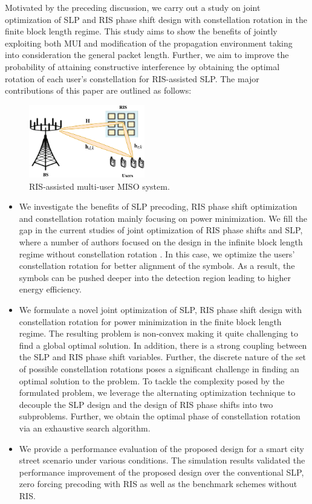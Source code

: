 \documentclass[10pt,conference]{IEEEtran}
\begin{document}
Motivated by the preceding discussion, we carry out a study on joint optimization of SLP and RIS phase shift design with constellation rotation in the finite block length regime. This study aims to show the benefits of jointly exploiting both MUI and modification of the propagation environment taking into consideration the general packet length. Further, we aim to improve the probability of attaining constructive interference by obtaining the optimal rotation of each user's constellation for RIS-assisted SLP.
The major contributions of this paper are outlined as follows:
\begin{figure}[t]
	\centering	\includegraphics[width=0.45\textwidth]{Images/symb33.eps} 
	\caption{RIS-assisted multi-user MISO system.}
	\label{fig:System}
\end{figure}
\begin{itemize}
    \item We investigate the benefits of SLP precoding, RIS phase shift optimization and constellation rotation mainly focusing on power minimization. We fill the gap in the current studies of joint optimization of RIS phase shifts and SLP, where a number of authors focused on the design in the infinite block length regime without constellation rotation \cite{shao2020minimum,liu2021intelligent,cheng2021degree}. In this case, we optimize the users' constellation rotation for better alignment of the symbols. As a result, the symbols can be pushed deeper into the detection region leading to higher energy efficiency. 
    \item We formulate a novel joint optimization of SLP, RIS phase shift design with constellation rotation for power minimization in the finite block length regime. The resulting problem is non-convex making it quite challenging to find a global optimal solution. In addition, there is a strong coupling between the SLP and RIS phase shift variables. Further, the discrete nature of the set of possible constellation rotations poses a significant challenge in finding an optimal solution to the problem. To tackle the complexity posed by the formulated problem, we leverage the alternating optimization technique to decouple the SLP design and the design of RIS phase shifts into two subproblems. Further, we obtain the optimal phase of constellation rotation via an exhaustive search algorithm.
    \item We provide a performance evaluation of the proposed design for a smart city street scenario under various conditions. The simulation results validated the performance improvement of the proposed design over the conventional SLP, zero forcing precoding with RIS as well as the benchmark schemes without RIS.
\end{itemize}
\end{document}
